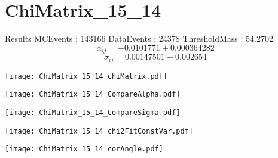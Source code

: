 \documentclass[a4paper,12pt]{article}
\begin{document}
\section{ChiMatrix\_15\_14}
\begin{minipage}{0.49\linewidth} Results \newline
MCEvents : 143166\newline
DataEvents : 24378 \newline
ThresholdMass : 54.2702\\
$$\alpha_{ij} = -0.0101771\pm 0.000364282$$
$$\sigma_{ij} = 0.00147501\pm 0.002654$$
\end{minipage}\hfill
\begin{minipage}{0.49\linewidth} 
\texttt{[image: ChiMatrix\_15\_14\_chiMatrix.pdf]}\\
\end{minipage}
\hfill
\begin{minipage}{0.49\linewidth} 
\texttt{[image: ChiMatrix\_15\_14\_CompareAlpha.pdf]}\\
\end{minipage}
\hfill
\begin{minipage}{0.49\linewidth} 
\texttt{[image: ChiMatrix\_15\_14\_CompareSigma.pdf]}\\
\end{minipage}
\begin{minipage}{0.49\linewidth} 
\texttt{[image: ChiMatrix\_15\_14\_chi2FitConstVar.pdf]}\\
\end{minipage}
\hfill
\begin{minipage}{0.49\linewidth} 
\texttt{[image: ChiMatrix\_15\_14\_corAngle.pdf]}\\
\end{minipage}
\end{document}
